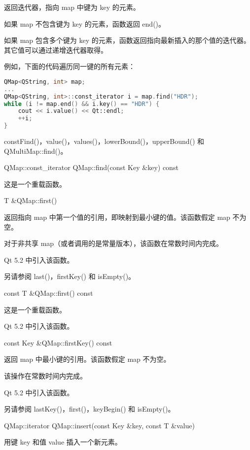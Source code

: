 返回迭代器，指向 map 中键为 key 的元素。

如果 map 不包含键为 key 的元素，函数返回 end()。

如果 map 包含多个键为 key 的元素，函数返回指向最新插入的那个值的迭代器。
其它值可以通过递增迭代器取得。

例如，下面的代码遍历同一键的所有元素：

\begin{lstlisting}[language=C++]
QMap<QString, int> map;
...
QMap<QString, int>::const_iterator i = map.find("HDR");
while (i != map.end() && i.key() == "HDR") {
    cout << i.value() << Qt::endl;
    ++i;
}
\end{lstlisting}


\begin{notice}[另请参阅]
constFind()，value()，values()，lowerBound()，upperBound() 和 QMultiMap::find()。
\end{notice}

\splitLine

QMap::const\_iterator QMap::find(const Key \&key) const

这是一个重载函数。

\splitLine

T \&QMap::first()

返回指向 map 中第一个值的引用，即映射到最小键的值。该函数假定 map 不为空。

对于非共享 map（或者调用的是常量版本），该函数在常数时间内完成。

Qt 5.2 中引入该函数。

另请参阅 last()，firstKey() 和 isEmpty()。

\splitLine

const T \&QMap::first() const

这是一个重载函数。

Qt 5.2 中引入该函数。

\splitLine

const Key \&QMap::firstKey() const

返回 map 中最小键的引用。该函数假定 map 不为空。

该操作在常数时间内完成。

Qt 5.2 中引入该函数。

另请参阅 lastKey()，first()，keyBegin() 和 isEmpty()。

\splitLine

QMap::iterator QMap::insert(const Key \&key, const T \&value)

用键 key 和值 value 插入一个新元素。

